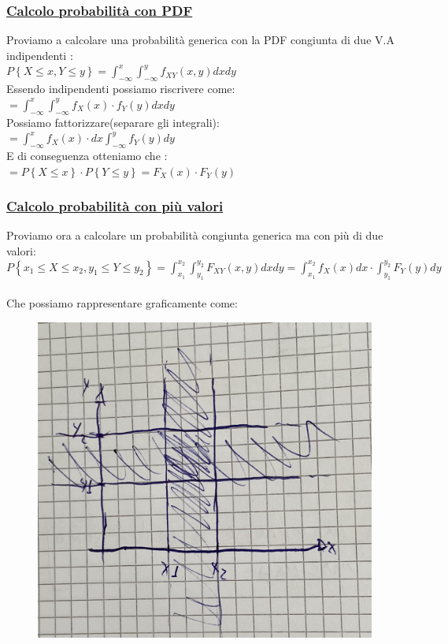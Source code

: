 \documentclass{article}
\begin{document}
\subsubsection{\underline{Calcolo probabilità con PDF}}
Proviamo a calcolare una probabilità generica con la PDF congiunta di due V.A indipendenti : \\
$P\left\{ X \leq x, Y \leq y \right\} = \int_{-\infty}^{x} \int_{-\infty}^{y} f_{XY}(x,y) dx dy$ \\
Essendo indipendenti possiamo riscrivere come: \\
$= \int_{-\infty}^{x} \int_{-\infty}^{y} f_X(x) \cdot f_Y(y) dx dy$ \\
Possiamo fattorizzare(separare gli integrali): \\
$= \int_{-\infty}^{x} f_X(x) \cdot dx \int_{-\infty}^{y}f_Y(y) dy$ \\
E di conseguenza otteniamo che : \\
$= P\left\{ X \leq x\right\} \cdot P\left\{ Y \leq y\right\} = F_X(x) \cdot F_Y(y)$
\subsubsection{\underline{Calcolo probabilità con più valori}}
Proviamo ora a calcolare un probabilità congiunta generica ma con più di due valori: \\
$P\left\{ x_1 \leq X \leq x_2, y_1 \leq Y \leq y_2 \right\} = \int_{x_1}^{x_2} \int_{y_1}^{y_2} F_{XY}(x,y) dx dy = \int_{x_1}^{x_2} f_X(x) dx \cdot \int_{y_1}^{y_2} F_Y(y) dy$ \\ \\
Che possiamo rappresentare graficamente come:
\begin{figure}[H]
\centering
\includegraphics[scale=0.14]{images/80.jpeg}
\end{figure} 
\end{document}
